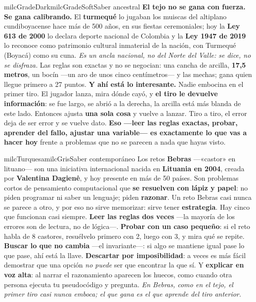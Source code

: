 \documentclass[11pt,letterpaper]{article}
\begin{document}
\begin{softbox}{milcGradeDark}{milcGradeSoft}{Saber ancestral}
\textbf{El tejo no se gana con fuerza. Se gana calibrando.} El \textbf{turmequé} lo jugaban los muiscas del altiplano cundiboyacense hace más de 500 años, en sus fiestas ceremoniales; hoy la \textbf{Ley 613 de 2000} lo declara deporte nacional de Colombia y la \textbf{Ley 1947 de 2019} lo reconoce como patrimonio cultural inmaterial de la nación, con Turmequé (Boyacá) como su cuna. \emph{Es un ancla nacional, no del Norte del Valle: se dice, no se disfraza.} Las reglas son exactas y no se negocian: una cancha de arcilla, \textbf{17,5 metros}, un bocín ---un aro de unos cinco centímetros--- y las mechas; gana quien llegue primero a 27 puntos. \textbf{Y ahí está lo interesante.} Nadie embocina en el primer tiro. El jugador lanza, mira dónde cayó, y \textbf{el tiro le devuelve información}: se fue largo, se abrió a la derecha, la arcilla está más blanda de este lado. Entonces ajusta \textbf{una sola cosa} y vuelve a lanzar. Tiro a tiro, el error deja de ser error y se vuelve dato. \textbf{Eso ---leer las reglas exactas, probar, aprender del fallo, ajustar una variable--- es exactamente lo que vas a hacer hoy} frente a problemas que no se parecen a nada que hayas visto.
\end{softbox}

\begin{softbox}{milcTurquesa}{milcGris}{Saber contemporáneo}
Los retos \textbf{Bebras} ---«castor» en lituano--- son una iniciativa internacional nacida en \textbf{Lituania en 2004}, creada por \textbf{Valentina Dagienė}, y hoy presente en más de 50 países. Son problemas cortos de pensamiento computacional que \textbf{se resuelven con lápiz y papel}: no piden programar ni saber un lenguaje; piden \textbf{razonar}. Un reto Bebras casi nunca se parece a otro, y por eso no sirve memorizar: sirve tener \textbf{estrategia}. Hay cinco que funcionan casi siempre. \textbf{Leer las reglas dos veces} ---la mayoría de los errores son de lectura, no de lógica---. \textbf{Probar con un caso pequeño}: si el reto habla de 8 castores, resuélvelo primero con 2, luego con 3, y mira qué se repite. \textbf{Buscar lo que no cambia} ---el invariante---: si algo se mantiene igual pase lo que pase, ahí está la llave. \textbf{Descartar por imposibilidad}: a veces es más fácil demostrar que una opción \emph{no puede} ser que encontrar la que sí. Y \textbf{explicar en voz alta}: al narrar el razonamiento aparecen los huecos, como cuando otra persona ejecuta tu pseudocódigo y pregunta. \emph{En Bebras, como en el tejo, el primer tiro casi nunca emboca; el que gana es el que aprende del tiro anterior.}
\end{softbox}
\end{document}
